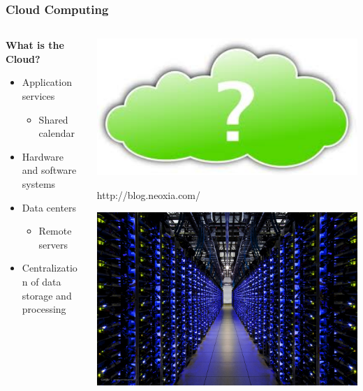 \documentclass{beamer}
\begin{document}
\begin{frame}
  \frametitle{Cloud Computing}
 \begin{columns}
	\begin{column}{0.55\textwidth}
 		\large{\textbf{What is the Cloud?}}
 		\begin{itemize}
 			\item Application services
 				\begin{itemize}
 					\item Shared calendar
 				\end{itemize}
 			\item Hardware and software systems 
 			\item Data centers 
 				\begin{itemize}
 					\item Remote servers
 				\end{itemize}
 			\item Centralization of data storage and processing
 		\end{itemize}
	\end{column}
\begin{column}{0.45\textwidth}
	\includegraphics[width=1.0\textwidth]{GreenQuestionMark.jpg} \\
	\tiny{
		\begin{flushright}
			http://blog.neoxia.com/
		\end{flushright}
	}
	\includegraphics[width=1.0\textwidth]{Servers.jpg} \\

\end{column}
\end{columns}
\end{frame}
\end{document}
